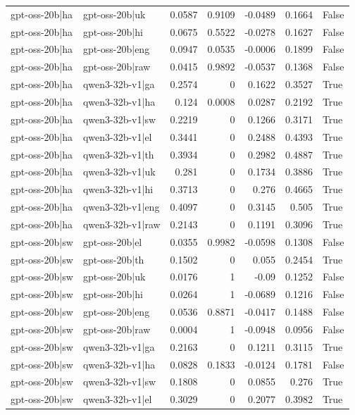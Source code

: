 \begin{table}
\begin{tabular}{l l r r r r l}
gpt-oss-20b|ha & gpt-oss-20b|uk & 0.0587 & 0.9109 & -0.0489 & 0.1664 & False \\
gpt-oss-20b|ha & gpt-oss-20b|hi & 0.0675 & 0.5522 & -0.0278 & 0.1627 & False \\
gpt-oss-20b|ha & gpt-oss-20b|eng & 0.0947 & 0.0535 & -0.0006 & 0.1899 & False \\
gpt-oss-20b|ha & gpt-oss-20b|raw & 0.0415 & 0.9892 & -0.0537 & 0.1368 & False \\
gpt-oss-20b|ha & qwen3-32b-v1|ga & 0.2574 & 0 & 0.1622 & 0.3527 & True \\
gpt-oss-20b|ha & qwen3-32b-v1|ha & 0.124 & 0.0008 & 0.0287 & 0.2192 & True \\
gpt-oss-20b|ha & qwen3-32b-v1|sw & 0.2219 & 0 & 0.1266 & 0.3171 & True \\
gpt-oss-20b|ha & qwen3-32b-v1|el & 0.3441 & 0 & 0.2488 & 0.4393 & True \\
gpt-oss-20b|ha & qwen3-32b-v1|th & 0.3934 & 0 & 0.2982 & 0.4887 & True \\
gpt-oss-20b|ha & qwen3-32b-v1|uk & 0.281 & 0 & 0.1734 & 0.3886 & True \\
gpt-oss-20b|ha & qwen3-32b-v1|hi & 0.3713 & 0 & 0.276 & 0.4665 & True \\
gpt-oss-20b|ha & qwen3-32b-v1|eng & 0.4097 & 0 & 0.3145 & 0.505 & True \\
gpt-oss-20b|ha & qwen3-32b-v1|raw & 0.2143 & 0 & 0.1191 & 0.3096 & True \\
gpt-oss-20b|sw & gpt-oss-20b|el & 0.0355 & 0.9982 & -0.0598 & 0.1308 & False \\
gpt-oss-20b|sw & gpt-oss-20b|th & 0.1502 & 0 & 0.055 & 0.2454 & True \\
gpt-oss-20b|sw & gpt-oss-20b|uk & 0.0176 & 1 & -0.09 & 0.1252 & False \\
gpt-oss-20b|sw & gpt-oss-20b|hi & 0.0264 & 1 & -0.0689 & 0.1216 & False \\
gpt-oss-20b|sw & gpt-oss-20b|eng & 0.0536 & 0.8871 & -0.0417 & 0.1488 & False \\
gpt-oss-20b|sw & gpt-oss-20b|raw & 0.0004 & 1 & -0.0948 & 0.0956 & False \\
gpt-oss-20b|sw & qwen3-32b-v1|ga & 0.2163 & 0 & 0.1211 & 0.3115 & True \\
gpt-oss-20b|sw & qwen3-32b-v1|ha & 0.0828 & 0.1833 & -0.0124 & 0.1781 & False \\
gpt-oss-20b|sw & qwen3-32b-v1|sw & 0.1808 & 0 & 0.0855 & 0.276 & True \\
gpt-oss-20b|sw & qwen3-32b-v1|el & 0.3029 & 0 & 0.2077 & 0.3982 & True \\

\end{tabular}
\end{table}
